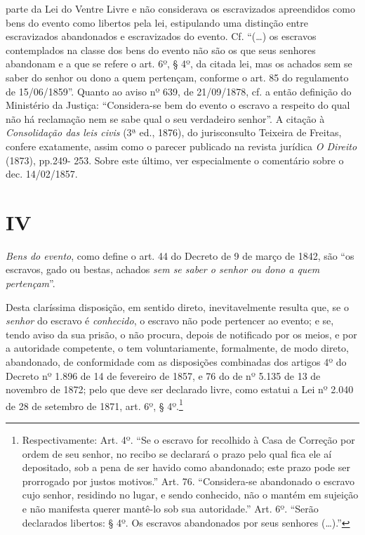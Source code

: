 {  parte da Lei do Ventre Livre e não considerava os escravizados
  apreendidos como bens do evento como libertos pela lei, estipulando
  uma distinção entre escravizados abandonados e escravizados do evento.
  Cf. ``(\ldots{}) os escravos contemplados na classe dos bens do evento não
  são os que seus senhores abandonam e a que se refere o art. 6º, § 4º,
  da citada lei, mas os achados sem se saber do senhor ou dono a quem
  pertençam, conforme o art. 85 do regulamento de 15/06/1859''. Quanto ao
  aviso nº 639, de 21/09/1878, cf. a então definição do Ministério da
  Justiça: ``Considera-se bem do evento o escravo a respeito do qual não
  há reclamação nem se sabe qual o seu verdadeiro senhor''. A citação à
  \emph{Consolidação das leis civis} (3ª ed., 1876), do jurisconsulto
  Teixeira de Freitas, confere exatamente, assim como o parecer
  publicado na revista jurídica \emph{O Direito} (1873), pp.249- 253.
  Sobre este último, ver especialmente o comentário sobre o dec.
  14/02/1857.}

\section*{IV}

\emph{Bens do evento}, como define o art. 44 do Decreto de 9 de março de
1842, são ``os escravos, gado ou bestas, achados \emph{sem se saber o
senhor ou dono a quem pertençam}''.

Desta claríssima disposição, em sentido direto, inevitavelmente resulta
que, se o \emph{senhor} do escravo é \emph{conhecido}, o escravo não
pode pertencer ao evento; e se, tendo aviso da sua prisão, o não
procura, depois de notificado por os meios, e por a autoridade
competente, o tem voluntariamente, formalmente, de modo direto,
abandonado, de conformidade com as disposições combinadas dos artigos 4º
do Decreto nº 1.896 de 14 de fevereiro de 1857, e 76 do de nº 5.135 de
13 de novembro de 1872; pelo que deve ser declarado livre, como estatui
a Lei nº 2.040 de 28 de setembro de 1871, art. 6º, § 4º.\footnote{
  Respectivamente: Art. 4º. ``Se o escravo for recolhido à Casa de
  Correção por ordem de seu senhor, no recibo se declarará o prazo pelo
  qual fica ele aí depositado, sob a pena de ser havido como abandonado;
  este prazo pode ser prorrogado por justos motivos.'' Art. 76.
  ``Considera-se abandonado o escravo cujo senhor, residindo no lugar, e
  sendo conhecido, não o mantém em sujeição e não manifesta querer
  mantê-lo sob sua autoridade.'' Art. 6º. ``Serão declarados libertos: § 4º.
  Os escravos abandonados por seus senhores (\ldots{}).''}

